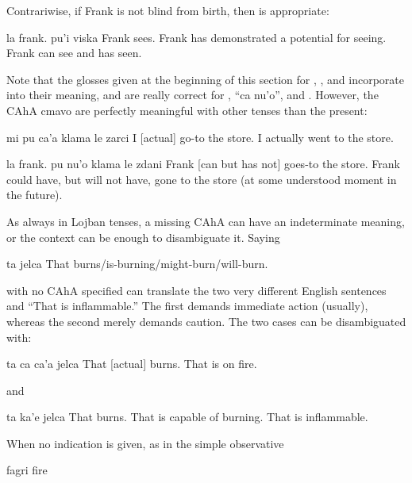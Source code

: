 Contrariwise, if Frank is not blind from birth, then 
    is appropriate:
\begin{example}
la frank. pu'i viska\n
Frank  sees.\n
Frank has demonstrated a potential for seeing.\n
Frank can see and has seen.
\end{example}

Note that the glosses given at the beginning of this section
    for , , and  incorporate  into
    their meaning, and are really correct for , ``ca
    nu'o'', and . However, the CAhA cmavo are perfectly
    meaningful with other tenses than the present:
\begin{example}
mi pu ca'a klama le zarci\n
I  [actual] go-to the store.\n
I actually went to the store.
\end{example}

\begin{example}
la frank. pu nu'o klama le zdani\n
Frank  [can but has not] goes-to the store.\n
Frank could have, but will not have, gone to the\n
\T	store (at some understood moment in the\n
\T	future).
\end{example}

As always in Lojban tenses, a missing CAhA can have an
    indeterminate meaning, or the context can be enough to
    disambiguate it. Saying
\begin{example}
ta jelca\n
That burns/is-burning/might-burn/will-burn.
\end{example}

{\noindent}with no CAhA specified can translate the two very different
    English sentences  and ``That is
    inflammable.'' The first demands immediate action (usually),
    whereas the second merely demands caution. The two cases can be
    disambiguated with:
\begin{example}
ta ca ca'a jelca\n
That  [actual] burns.\n
That is on fire.
\end{example}

{\noindent}and
\begin{example}
ta ka'e jelca\n
That  burns.\n
That is capable of burning.\n
That is inflammable.
\end{example}

When no indication is given, as in the simple observative
\begin{example}
fagri\n
fire
\end{example}


